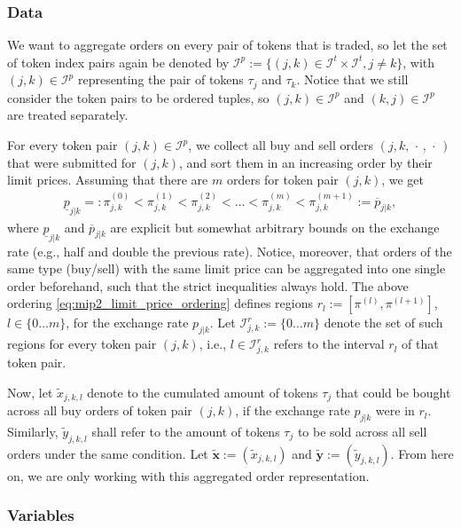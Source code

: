 \documentclass[11pt,parskip=full]{scrartcl}%
\newcommand*{\ie}{i.e., }
\newcommand*{\eg}{e.g., }
\newcommand*{\itokens}{\mathcal{I}^t}       %
\newcommand*{\itokenpairs}{\mathcal{I}^p}   %
\begin{document}
\subsubsection*{Data}

We want to aggregate orders on every pair of tokens that is traded, so let the set of token index
pairs again be denoted by $ \itokenpairs := \{(j,k) \in \itokens \times \itokens, j \neq k\} $,
with $ (j,k) \in \itokenpairs $ representing the pair of tokens $ \tau_j $ and $ \tau_k $.
Notice that we still consider the token pairs to be ordered tuples, so $ (j,k) \in \itokenpairs $
and $ (k,j) \in \itokenpairs $ are treated separately.

For every token pair $ (j,k) \in \itokenpairs $, we collect all buy and sell orders
$ (j, k,\, \cdot \,,\, \cdot \,) $ that were submitted for $ (j,k) $, and sort them in an
increasing order by their limit prices.
Assuming that there are $ m $ orders for token pair $ (j,k) $, we get
\begin{align}
  \underline{p}_{j|k} =:
    \pi^{(0)}_{j,k} < \pi^{(1)}_{j,k} < \pi^{(2)}_{j,k} <
    \ldots < \pi^{(m)}_{j,k} < \pi^{(m+1)}_{j,k}
  := \overline{p}_{j|k},
  \label{eq:mip2_limit_price_ordering}
\end{align}
where $ \underline{p}_{j|k} $ and $ \overline{p}_{j|k} $ are explicit but somewhat arbitrary bounds
on the exchange rate (\eg half and double the previous rate).
Notice, moreover, that orders of the same type (buy/sell) with the same limit price can be
aggregated into one single order beforehand, such that the strict inequalities always hold.
The above ordering \eqref{eq:mip2_limit_price_ordering} defines regions
$ r_l := [\pi^{(l)},\pi^{(l+1)}] $, $ l \in \{0 \ldots m\} $, for the exchange rate $ p_{j|k} $.
Let $ \mathcal{I}_{j,k}^r := \{0 \ldots m\} $ denote the set of such regions for every token pair
$ (j,k) $, \ie $ l \in \mathcal{I}_{j,k}^r $ refers to the interval $ r_l $ of that token pair.

Now, let $ \tilde{x}_{j,k,l} $ denote to the cumulated amount of tokens $ \tau_j $ that could be
bought across all buy orders of token pair $ (j,k) $, if the exchange rate $ p_{j|k} $ were in
$ r_l $.
Similarly, $ \tilde{y}_{j,k,l} $ shall refer to the amount of tokens $ \tau_j $ to be sold across
all sell orders under the same condition.
Let $ \tilde{\mathbf{x}} := (\tilde{x}_{j,k,l}) $ and
$ \tilde{\mathbf{y}} := (\tilde{y}_{j,k,l}) $.
From here on, we are only working with this aggregated order representation.


\subsubsection*{Variables}
\end{document}
